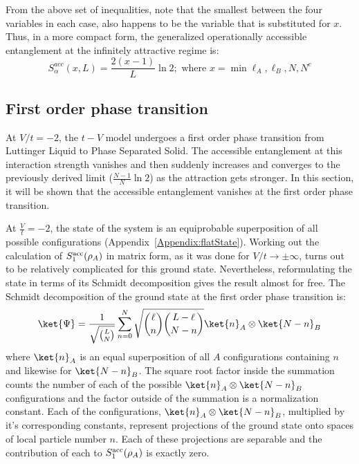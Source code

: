 %
From the above set of inequalities, note that the smallest between the four variables in each case, also happens to be the variable that is substituted for $x$. Thus, in a more compact form, the generalized operationally accessible entanglement at the infinitely attractive regime is:
%
\begin{equation}
S_\alpha^{acc}(x,L) = \frac{2(x-1)}{L} \ln{2} ; \text{ where } x = \min{\ell_A, \ell_B, N, N^c}
\end{equation}
%
	\subsection{First order phase transition}
	
At $V/t = -2$, the $t-V$ model undergoes a first order phase transition from Luttinger Liquid to Phase Separated Solid. The accessible entanglement at this interaction strength vanishes and then suddenly increases and converges to the previously derived limit ($\frac{N-1}{N}\ln{2}$) as the attraction gets stronger. In this section, it will be shown that the accessible entanglement vanishes at the first order phase transition.

At $\frac{V}{t}=-2$, the state of the system is an equiprobable superposition of all possible configurations (Appendix~\ref{Appendix:flatState}). Working out the calculation of $S_1^{\rm acc}(\rho_A)$ in matrix form, as it was done for $V/t\to\pm\infty$, turns out to be relatively complicated for this ground state. Nevertheless, reformulating the state in terms of its Schmidt decomposition gives the result almost for free. The Schmidt decomposition of the ground state at the first order phase transition is:
%
\begin{equation}
\ket{\Psi} = \frac{1}{\sqrt{{{L}\choose{N}}}} \sum_{n=0}^{N} \sqrt{{{\ell}\choose{n}}{{L-\ell}\choose{N-n}}} \ket{n}_A \otimes \ket{N-n}_B
\end{equation}
%
where $\ket{n}_A$ is an equal superposition of all $A$ configurations containing $n$ and likewise for $\ket{N-n}_B$. The square root factor inside the summation counts the number of each of the possible $\ket{n}_A \otimes \ket{N-n}_B$ configurations and the factor outside of the summation is a normalization constant. Each of the configurations, $\ket{n}_A \otimes \ket{N-n}_B$, multiplied by it's corresponding constants, represent projections of the ground state onto spaces of local particle number $n$. Each of these projections are  separable and the contribution of each to $S_1^{\rm acc}(\rho_A)$ is exactly zero. 

